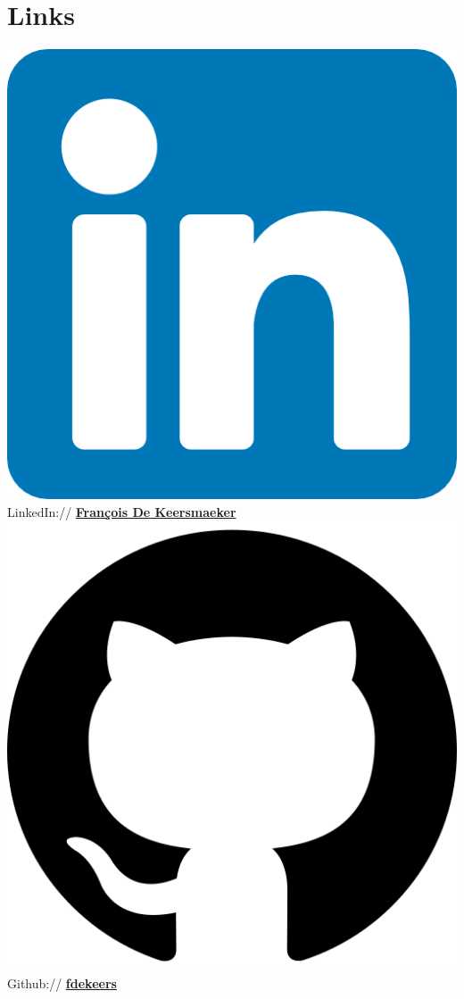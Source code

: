 \documentclass[]{deedy-resume-openfont}
\begin{document}
\begin{minipage}[t]{0.35\textwidth}
\section{Links} 
\includegraphics[scale=0.03]{images/linkedin.png} LinkedIn://  \href{https://www.linkedin.com/in/françois-de-keersmaeker-11301a210/}{\bf François De Keersmaeker} \\
\includegraphics[scale=0.03]{images/github.png} Github:// \href{https://github.com/fdekeers}{\bf fdekeers} \\

\end{minipage}
\end{document}
